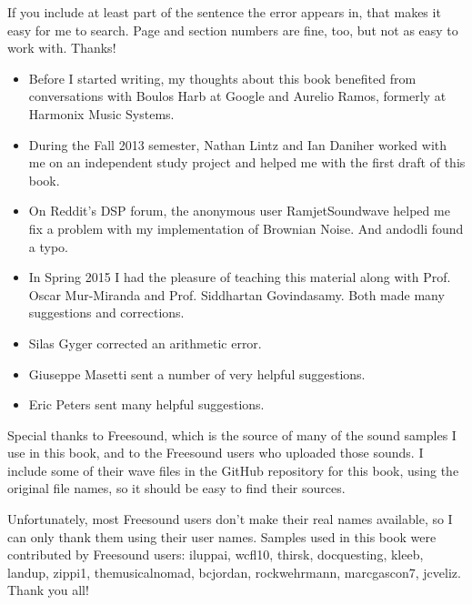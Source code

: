 If you include at least part of the sentence the
error appears in, that makes it easy for me to search.  Page and
section numbers are fine, too, but not as easy to work with.
Thanks!

\small

\begin{itemize}
	
	\item Before I started writing, my thoughts about this book
	benefited from conversations with Boulos Harb at Google and
	Aurelio Ramos, formerly at Harmonix Music Systems.
	
	\item During the Fall 2013 semester, Nathan Lintz and Ian Daniher
	worked with me on an independent study project and helped me with
	the first draft of this book.
	
	\item On Reddit's DSP forum, the anonymous user RamjetSoundwave
	helped me fix a problem with my implementation of Brownian Noise.
	And andodli found a typo.
	
	\item In Spring 2015 I had the pleasure of teaching this material
	along with Prof. Oscar Mur-Miranda and Prof. Siddhartan Govindasamy.
	Both made many suggestions and corrections.
	
	\item Silas Gyger corrected an arithmetic error.
	
	\item Giuseppe Masetti sent a number of very helpful suggestions.
	
	\item Eric Peters sent many helpful suggestions.
	
	
\end{itemize}


Special thanks to Freesound, which is the source of many of the
sound samples I use in this book, and to the Freesound users who
uploaded those sounds.  I include some of their wave files in
the GitHub repository for this book, using the original file
names, so it should be easy to find their sources.

Unfortunately, most Freesound users don't make their real names
available, so I can only thank them using their user names.  Samples
used in this book were contributed by Freesound users: iluppai,
wcfl10, thirsk, docquesting, kleeb, landup, zippi1, themusicalnomad,
bcjordan, rockwehrmann, marcgascon7, jcveliz.  Thank you all!

